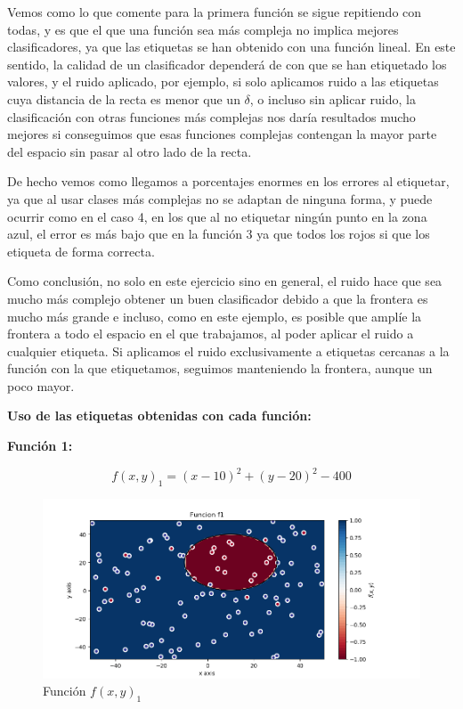 \documentclass[12pt, spanish]{article}
\begin{document}
Vemos como lo que comente para la primera función se sigue repitiendo con todas, y es que el que una función sea más compleja no implica mejores clasificadores, ya que las etiquetas se han obtenido con una función lineal. En este sentido, la calidad de un clasificador dependerá de con que se han etiquetado los valores, y el ruido aplicado, por ejemplo, si solo aplicamos ruido a las etiquetas cuya distancia de la recta es menor que un $\delta$, o incluso sin aplicar ruido,  la clasificación con otras funciones más complejas nos daría resultados mucho mejores si conseguimos que esas funciones complejas contengan la mayor parte del espacio sin pasar al otro lado de la recta.

De hecho vemos como llegamos a porcentajes enormes en los errores al etiquetar, ya que al usar clases más complejas no se adaptan de ninguna forma, y puede ocurrir como en el caso 4, en los que al no etiquetar ningún punto en la zona azul, el error es más bajo que en la función 3 ya que todos los rojos si que los etiqueta de forma correcta.

Como conclusión, no solo en este ejercicio sino en general, el ruido hace que sea mucho más complejo obtener un buen clasificador debido a que la frontera es mucho más grande e incluso, como en este ejemplo, es posible que amplíe la frontera a todo el espacio en el que trabajamos, al poder aplicar el ruido a cualquier etiqueta. Si aplicamos el ruido exclusivamente a etiquetas cercanas a la función con la que etiquetamos, seguimos manteniendo la frontera, aunque un poco mayor.

\textbf{Uso de las etiquetas obtenidas con cada función:}

\textbf{Función 1:} 

$$ f(x, y)_1 = (x - 10)^2 + (y - 20)^2 - 400  $$

\begin{figure}[H]
  \centering
      \includegraphics[scale = 0.70]{ej1-3-f1-etiq.png}
 		 \caption{Función $f(x, y)_1$}
  		\label{fig:ej1-f1}

\end{figure}
\end{document}
